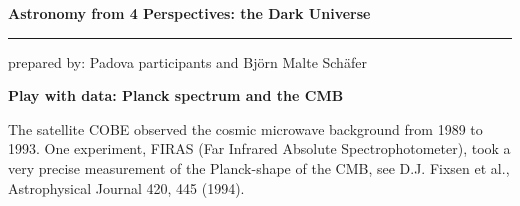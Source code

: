 \documentclass[a4paper,12pt]{article}
\newcommand{\HRule}{\rule{\linewidth}{0.3mm}}
\begin{document}
\pagestyle{empty}


\begin{center}
\LARGE \textbf{Astronomy from 4 Perspectives: the Dark Universe}
\HRule
\end{center}
\begin{flushright}
prepared by: Padova participants and Bj{\"o}rn Malte Sch{\"a}fer
\end{flushright}
\begin{center}
{\Large \textbf{Play with data: Planck spectrum and the CMB}}
\end{center}
\vspace{5mm}

\noindent
The satellite COBE observed the cosmic microwave background from 1989 to 1993. One experiment, FIRAS (Far Infrared Absolute Spectrophotometer), took a very precise measurement of the Planck-shape of the CMB, see D.J. Fixsen et al., Astrophysical Journal 420, 445 (1994).
\end{document}
